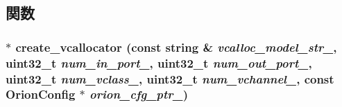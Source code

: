 \subsection{関数}
\hypertarget{classVCAllocator_a745bd92fa44e4cfb30420743174c318d}{
\subsubsection[{create\_\-vcallocator}]{ $\ast$ create\_\-vcallocator (const string \& {\em vcalloc\_\-model\_\-str\_\-}, \/  {\bf uint32\_\-t} {\em num\_\-in\_\-port\_\-}, \/  {\bf uint32\_\-t} {\em num\_\-out\_\-port\_\-}, \/  {\bf uint32\_\-t} {\em num\_\-vclass\_\-}, \/  {\bf uint32\_\-t} {\em num\_\-vchannel\_\-}, \/  const {\bf OrionConfig} $\ast$ {\em orion\_\-cfg\_\-ptr\_\-})}}
\label{classVCAllocator_a745bd92fa44e4cfb30420743174c318d}




